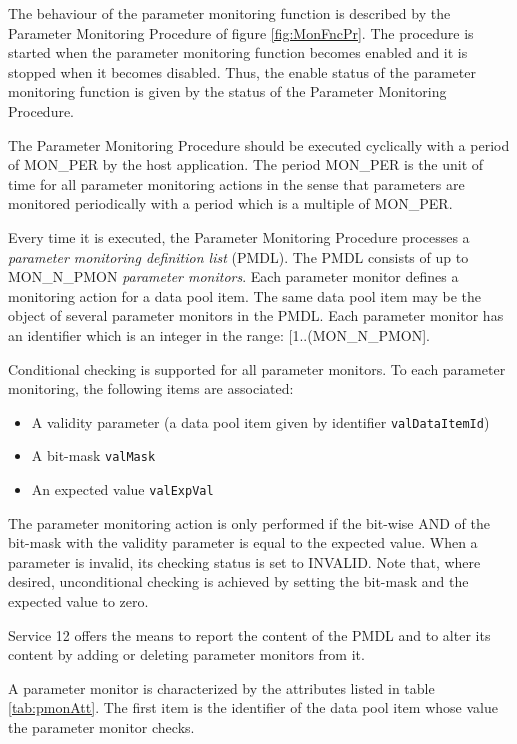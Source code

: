 \documentclass{pnp_article}
\begin{document}
The behaviour of the parameter monitoring function is described by the Parameter Monitoring Procedure of figure \ref{fig:MonFncPr}. The procedure is started when the parameter monitoring function becomes enabled and it is stopped when it becomes disabled. Thus, the enable status of the parameter monitoring function is given by the status of the Parameter Monitoring Procedure.

The Parameter Monitoring Procedure should be executed cyclically with a period of MON\_PER by the host application. The period MON\_PER is the unit of time for all parameter monitoring actions in the sense that parameters are monitored periodically with a period which is a multiple of MON\_PER.

Every time it is executed, the Parameter Monitoring Procedure processes a \textit{parameter monitoring definition list} (PMDL). The PMDL consists of up to MON\_N\_PMON \textit{parameter monitors}. Each parameter monitor defines a monitoring action for a data pool item. The same data pool item may be the object of several parameter monitors in the PMDL. Each parameter monitor has an identifier which is an integer in the range: [1..(MON\_N\_PMON].

Conditional checking is supported for all parameter monitors. To each parameter monitoring, the following items are associated: 

\begin{itemize}
\item A validity parameter (a data pool item given by identifier \texttt{valDataItemId})
\item A bit-mask \texttt{valMask}
\item An expected value \texttt{valExpVal}
\end{itemize}

The parameter monitoring action is only performed if the bit-wise AND of the bit-mask with the validity parameter is equal to the expected value. When a parameter is invalid, its checking status is set to INVALID. Note that, where desired, unconditional checking is achieved by setting the bit-mask and the expected value to zero.

Service 12 offers the means to report the content of the PMDL and to alter its content by adding or deleting parameter monitors from it.

A parameter monitor is characterized by the attributes listed in table \ref{tab:pmonAtt}. The first item is the identifier of the data pool item whose value the parameter monitor checks. 
\end{document}
